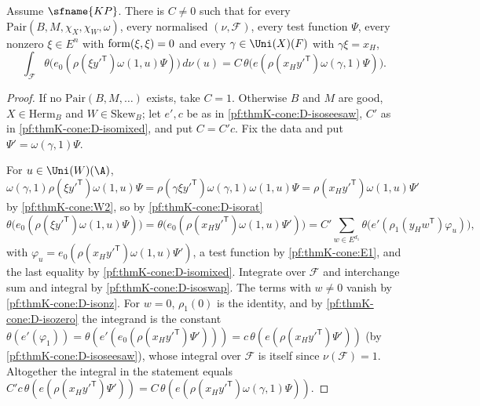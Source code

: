 \begin{lemma}\label{pf:thmK-cone:iso}
Assume $\sfname{KP}$.  There is $C\neq0$ such that for every $\mathrm{Pair}(B,M,\chi_X,\chi_W,\omega)$, every normalised
$(\nu,\mathcal F)$, every test function $\Psi$, every nonzero $\xi\in E^n$ with $\operatorname{form}(\xi,\xi)=0$ and every
$\gamma\in\Uni(X)(F)$ with $\gamma\xi=x_H$,
\[
  \int_{\mathcal F}\theta\bigl(e_0(\rho(\xi y'^{\mathsf T})\omega(1,u)\Psi)\bigr)\,d\nu(u)
  =C\,\theta\bigl(e(\rho(x_Hy'^{\mathsf T})\omega(\gamma,1)\Psi)\bigr).
\]
\end{lemma}

\begin{proof}
If no $\mathrm{Pair}(B,M,\dots)$ exists, take $C=1$.  Otherwise $B$ and $M$ are good, $X\in\mathrm{Herm}_B$ and
$W\in\mathrm{Skew}_B$; let $e',c$ be as in \ref{pf:thmK-cone:D-isoseesaw}, $C'$ as in \ref{pf:thmK-cone:D-isomixed}, and put
$C=C'c$.  Fix the data and put $\Psi'=\omega(\gamma,1)\Psi$.

For $u\in\Uni(W)(\A)$, $\omega(\gamma,1)\rho(\xi y'^{\mathsf T})\omega(1,u)\Psi=\rho(\gamma\xi y'^{\mathsf T})
\omega(\gamma,1)\omega(1,u)\Psi=\rho(x_Hy'^{\mathsf T})\omega(1,u)\Psi'$ by \ref{pf:thmK-cone:W2}, so by
\ref{pf:thmK-cone:D-isorat}
\[
  \theta\bigl(e_0(\rho(\xi y'^{\mathsf T})\omega(1,u)\Psi)\bigr)=\theta\bigl(e_0(\rho(x_Hy'^{\mathsf T})\omega(1,u)\Psi')\bigr)
  =C'\sum_{w\in E^{d_1}}\theta\bigl(e'(\rho_1(y_Hw^{\mathsf T})\varphi_u)\bigr),
\]
with $\varphi_u=e_0(\rho(x_Hy'^{\mathsf T})\omega(1,u)\Psi')$, a test function by \ref{pf:thmK-cone:E1}, and the last
equality by \ref{pf:thmK-cone:D-isomixed}.  Integrate over $\mathcal F$ and interchange sum and integral by
\ref{pf:thmK-cone:D-isoswap}.  The terms with $w\neq0$ vanish by \ref{pf:thmK-cone:D-isonz}.  For $w=0$,
$\rho_1(0)$ is the identity, and by \ref{pf:thmK-cone:D-isozero} the integrand is the constant
$\theta(e'(\varphi_1))=\theta(e'(e_0(\rho(x_Hy'^{\mathsf T})\Psi')))=c\,\theta(e(\rho(x_Hy'^{\mathsf T})\Psi'))$ (by
\ref{pf:thmK-cone:D-isoseesaw}), whose integral over $\mathcal F$ is itself since $\nu(\mathcal F)=1$.  Altogether the
integral in the statement equals $C'c\,\theta(e(\rho(x_Hy'^{\mathsf T})\Psi'))=C\,\theta(e(\rho(x_Hy'^{\mathsf T})
\omega(\gamma,1)\Psi))$.
\end{proof}

